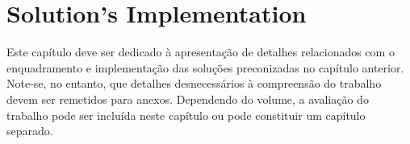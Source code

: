 \chapter{Solution's Implementation} %
\label{chap:impl}

Este capítulo deve ser dedicado à apresentação de detalhes relacionados com o enquadramento e implementação das soluções preconizadas no capítulo anterior. Note-se, no entanto, que detalhes desnecessários à compreensão do trabalho devem ser remetidos para anexos. Dependendo do volume, a avaliação do trabalho pode ser incluída neste capítulo ou pode constituir um capítulo separado.





